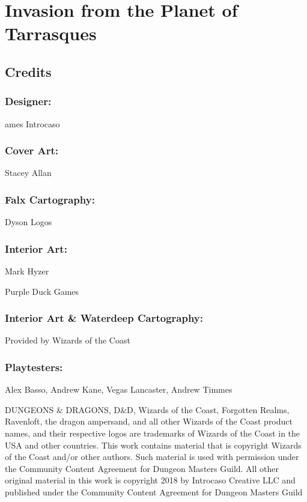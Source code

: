 \documentclass[10pt,a4paper,twoside,bg=print,twocolumn,openany,nodeprecatedcode]{dndbook}
\date{}
\begin{document}
\frontmatter
\tableofcontents
\mainmatter
\chapter{Invasion from the Planet of Tarrasques}
\section{Credits}
\subsection{Designer:}
ames Introcaso


\subsection{Cover Art:}
Stacey Allan

\subsection{Falx Cartography:}
Dyson Logos

\subsection{Interior Art:}
Mark Hyzer

Purple Duck Games

\subsection{Interior Art \& Waterdeep Cartography:}
Provided by Wizards of the Coast

\subsection{Playtesters:}
Alex Basso, Andrew Kane, Vegas Lancaster, Andrew Timmes

DUNGEONS \& DRAGONS, D\&D, Wizards of the Coast, Forgotten Realms, Ravenloft, the dragon ampersand, and all other Wizards of the Coast product names, and their respective logos are trademarks of Wizards of the Coast in the USA and other countries. This work contains material that is copyright Wizards of the Coast and/or other authors. Such material is used with permission under the Community Content Agreement for Dungeon Masters Guild. All other original material in this work is copyright 2018 by Introcaso Creative LLC and published under the Community Content Agreement for Dungeon Masters Guild
\end{document}
